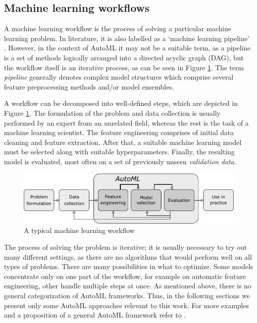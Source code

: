 \subsection{Machine learning workflows}
A machine learning workflow is the process of solving a particular machine
learning problem. In literature, it is also labelled as a `machine learning
pipeline' \cite{DBLP:journals/corr/abs-1810-13306}. However, in the context
of AutoML it may not be a suitable term, as a pipeline is a set of methods
logically arranged into a directed acyclic graph (DAG), but the workflow itself
is an iterative process, as can be seen in Figure \ref{pic01:workflow}.
The term \emph{pipeline} generally denotes complex model structures which
comprise several feature preprocessing methods and/or model
ensembles.

A workflow can be decomposed into well-defined steps, which are depicted in
Figure \ref{pic01:workflow}. The formulation of the problem and data collection
is usually performed by an expert from an unrelated field, whereas the rest is
the task of a machine learning scientist. The feature engineering comprises
of initial data cleaning and feature extraction.
After that, a suitable machine learning model must be selected along with
suitable hyperparameters. Finally, the resulting model is evaluated, most
often on a set of previously unseen \emph{validation data}.

\begin{figure}[ht]\centering
\includegraphics[width=\textwidth]{../img/workflow-pdfa.pdf}
\caption{A typical machine learning workflow}
\label{pic01:workflow}
\end{figure}

The process of solving the problem is iterative; it is usually necessary to try
out many different settings, as there are no algorithms that would perform
well on all types of problems.
There are many possibilities in what to optimize. Some models concentrate only
on one part of the workflow, for example on automatic feature engineering,
other handle multiple steps at once. As mentioned above, there is no general
categorization %
of AutoML frameworks. Thus, in the following sections we present only some
AutoML approaches relevant to this work. For more examples and a proposition
of a general AutoML framework refer to \cite{DBLP:journals/corr/abs-1810-13306}.

